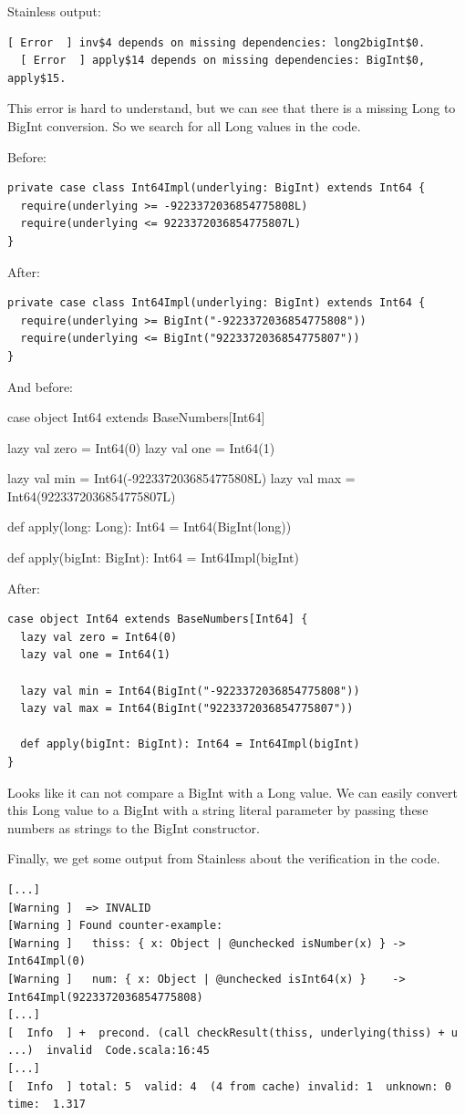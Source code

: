 \documentclass[runningheads]{llncs}
\begin{document}
Stainless output:
\begin{lstlisting}[style=stainless]
  [ Error  ] inv$4 depends on missing dependencies: long2bigInt$0.
  [ Error  ] apply$14 depends on missing dependencies: BigInt$0, apply$15.
\end{lstlisting}

This error is hard to understand, but we can see that there is a missing Long to BigInt conversion.
So we search for all Long values in the code.

Before:
\begin{lstlisting}[style=scala]
private case class Int64Impl(underlying: BigInt) extends Int64 {
  require(underlying >= -9223372036854775808L)
  require(underlying <= 9223372036854775807L)
}
\end{lstlisting}

After:
\begin{lstlisting}[style=scala]
private case class Int64Impl(underlying: BigInt) extends Int64 {
  require(underlying >= BigInt("-9223372036854775808"))
  require(underlying <= BigInt("9223372036854775807"))
}  
\end{lstlisting}

And before:
\begin{latlisting}[style=scala]
case object Int64 extends BaseNumbers[Int64] {
  lazy val zero = Int64(0)
  lazy val one = Int64(1)

  lazy val min = Int64(-9223372036854775808L)
  lazy val max = Int64(9223372036854775807L)

  def apply(long: Long): Int64 = Int64(BigInt(long))

  def apply(bigInt: BigInt): Int64 = Int64Impl(bigInt)
}
\end{latlisting}

After:
\begin{lstlisting}[style=scala]
case object Int64 extends BaseNumbers[Int64] {
  lazy val zero = Int64(0)
  lazy val one = Int64(1)

  lazy val min = Int64(BigInt("-9223372036854775808"))
  lazy val max = Int64(BigInt("9223372036854775807"))

  def apply(bigInt: BigInt): Int64 = Int64Impl(bigInt)
}
\end{lstlisting}

Looks like it can not compare a BigInt with a Long value.
We can easily convert this Long value to a BigInt with a string literal parameter by passing these numbers as strings to the BigInt constructor.

Finally, we get some output from Stainless about the verification in the code.
\begin{lstlisting}[style=stainless]
[...]
[Warning ]  => INVALID
[Warning ] Found counter-example:
[Warning ]   thiss: { x: Object | @unchecked isNumber(x) } -> Int64Impl(0)
[Warning ]   num: { x: Object | @unchecked isInt64(x) }    -> Int64Impl(9223372036854775808)
[...]
[  Info  ] +  precond. (call checkResult(thiss, underlying(thiss) + u ...)  invalid  Code.scala:16:45
[...]
[  Info  ] total: 5  valid: 4  (4 from cache) invalid: 1  unknown: 0  time:  1.317
\end{lstlisting}
\end{document}

